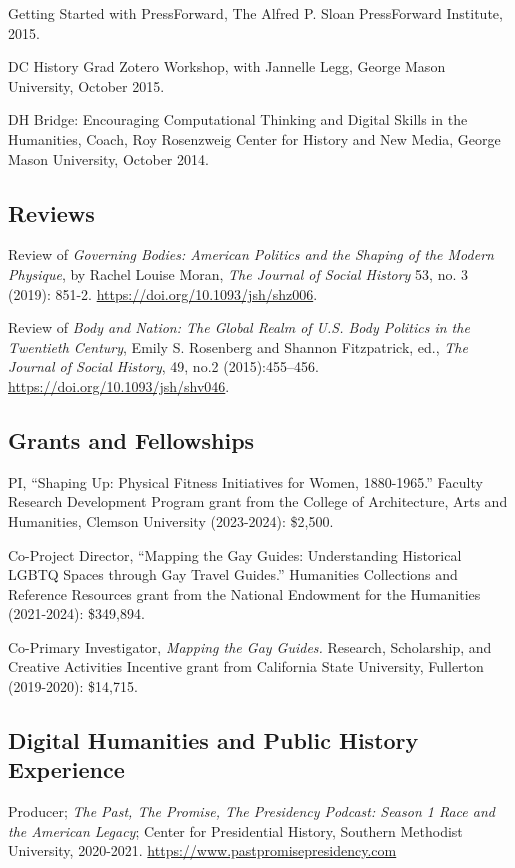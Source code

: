 \documentclass[11pt]{article}
\begin{document}
Getting Started with PressForward, The Alfred P. Sloan PressForward Institute, 2015.

DC History Grad Zotero Workshop, with Jannelle Legg, George Mason University, October 2015.

DH Bridge: Encouraging Computational Thinking and Digital Skills in the Humanities, Coach, Roy Rosenzweig Center for History and New Media, George Mason University, October 2014.

\subsection{Reviews}\label{reviews}

Review of \emph{Governing Bodies: American Politics and the Shaping of the Modern Physique}, by Rachel Louise Moran, \emph{The Journal of Social History} 53, no. 3 (2019): 851-2. \url{https://doi.org/10.1093/jsh/shz006}.

Review of \emph{Body and Nation: The Global Realm of U.S. Body Politics in the Twentieth Century}, Emily S. Rosenberg and Shannon Fitzpatrick, ed., \emph{The Journal of Social History}, 49, no.2 (2015):455–456. \url{https://doi.org/10.1093/jsh/shv046}.

\subsection{Grants and Fellowships}
PI, ``Shaping Up: Physical Fitness Initiatives for Women, 1880-1965.'' Faculty Research Development Program grant from the College of Architecture, Arts and Humanities, Clemson University (2023-2024): \$2,500.

Co-Project Director, ``Mapping the Gay Guides: Understanding Historical LGBTQ Spaces through Gay Travel Guides.'' Humanities Collections and Reference Resources grant from the National Endowment for the Humanities (2021-2024): \$349,894.

Co-Primary Investigator, \emph{Mapping the Gay Guides.} Research, Scholarship, and Creative Activities Incentive grant from California State University, Fullerton (2019-2020): \$14,715.

\subsection{Digital Humanities and Public History Experience}

Producer; \emph{The Past, The Promise, The Presidency Podcast: Season 1 Race and the American Legacy}; Center for Presidential History, Southern Methodist University, 2020-2021. \url{https://www.pastpromisepresidency.com}
\end{document}
